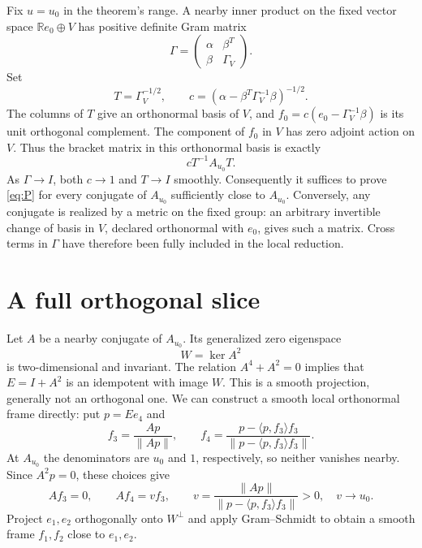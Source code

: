 \documentclass[11pt]{article}
\newcommand{\R}{\mathbb R}
\newcommand{\norm}[1]{\lVert #1\rVert}
\begin{document}
Fix \(u=u_0\) in the theorem's range. A nearby inner product on the
fixed vector space \(\R e_0\oplus V\) has positive definite Gram matrix
\[
 \Gamma=\begin{pmatrix}\alpha&\beta^T\\\beta&\Gamma_V\end{pmatrix}.
\]
Set
\[
 T=\Gamma_V^{-1/2},\qquad
 c=(\alpha-\beta^T\Gamma_V^{-1}\beta)^{-1/2}.
\]
The columns of \(T\) give an orthonormal basis of \(V\), and
\(f_0=c(e_0-\Gamma_V^{-1}\beta)\) is its unit orthogonal complement.
The component of \(f_0\) in \(V\) has zero adjoint action on \(V\).
Thus the bracket matrix in this orthonormal basis is exactly
\begin{equation}\label{eq:allmetrics}
 cT^{-1}A_{u_0}T.
\end{equation}
As \(\Gamma\to I\), both \(c\to1\) and \(T\to I\) smoothly.
Consequently it suffices to prove \eqref{eq:P} for every conjugate of
\(A_{u_0}\) sufficiently close to \(A_{u_0}\).
Conversely, any conjugate is realized by a metric on the fixed group:
an arbitrary invertible change of basis in \(V\), declared orthonormal
with \(e_0\), gives such a matrix. Cross terms in \(\Gamma\) have
therefore been fully included in the local reduction.

\section{A full orthogonal slice}

Let \(A\) be a nearby conjugate of \(A_{u_0}\).
Its generalized zero eigenspace
\[
 W=\ker A^2
\]
is two-dimensional and invariant. The relation \(A^4+A^2=0\) implies
that \(E=I+A^2\) is an idempotent with image \(W\).
This is a smooth projection, generally not an orthogonal one.
We can construct a smooth local orthonormal frame directly:
put \(p=Ee_4\) and
\[
 f_3=\frac{Ap}{\norm{Ap}},\qquad
 f_4=\frac{p-\langle p,f_3\rangle f_3}
 {\norm{p-\langle p,f_3\rangle f_3}}.
\]
At \(A_{u_0}\) the denominators are \(u_0\) and \(1\), respectively,
so neither vanishes nearby. Since \(A^2p=0\), these choices give
\[
 Af_3=0,\qquad Af_4=vf_3,\qquad
 v=\frac{\norm{Ap}}{\norm{p-\langle p,f_3\rangle f_3}}>0,
 \quad v\longrightarrow u_0.
\]
Project \(e_1,e_2\) orthogonally onto \(W^\perp\) and apply
Gram--Schmidt to obtain a smooth frame \(f_1,f_2\) close to \(e_1,e_2\).
\end{document}
